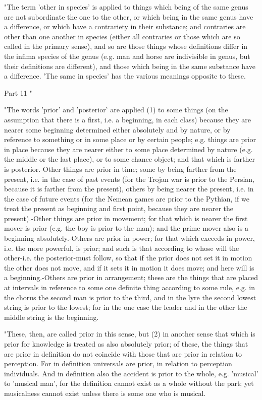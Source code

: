 "The term 'other in species' is applied to things which being of the
same genus are not subordinate the one to the other, or which being
in the same genus have a difference, or which have a contrariety in
their substance; and contraries are other than one another in species
(either all contraries or those which are so called in the primary
sense), and so are those things whose definitions differ in the infima
species of the genus (e.g. man and horse are indivisible in genus,
but their definitions are different), and those which being in the
same substance have a difference. 'The same in species' has the various
meanings opposite to these. 

Part 11 "

"The words 'prior' and 'posterior' are applied (1) to some things
(on the assumption that there is a first, i.e. a beginning, in each
class) because they are nearer some beginning determined either absolutely
and by nature, or by reference to something or in some place or by
certain people; e.g. things are prior in place because they are nearer
either to some place determined by nature (e.g. the middle or the
last place), or to some chance object; and that which is farther is
posterior.-Other things are prior in time; some by being farther from
the present, i.e. in the case of past events (for the Trojan war is
prior to the Persian, because it is farther from the present), others
by being nearer the present, i.e. in the case of future events (for
the Nemean games are prior to the Pythian, if we treat the present
as beginning and first point, because they are nearer the present).-Other
things are prior in movement; for that which is nearer the first mover
is prior (e.g. the boy is prior to the man); and the prime mover also
is a beginning absolutely.-Others are prior in power; for that which
exceeds in power, i.e. the more powerful, is prior; and such is that
according to whose will the other-i.e. the posterior-must follow,
so that if the prior does not set it in motion the other does not
move, and if it sets it in motion it does move; and here will is a
beginning.-Others are prior in arrangement; these are the things that
are placed at intervals in reference to some one definite thing according
to some rule, e.g. in the chorus the second man is prior to the third,
and in the lyre the second lowest string is prior to the lowest; for
in the one case the leader and in the other the middle string is the
beginning. 

"These, then, are called prior in this sense, but (2) in another sense
that which is prior for knowledge is treated as also absolutely prior;
of these, the things that are prior in definition do not coincide
with those that are prior in relation to perception. For in definition
universals are prior, in relation to perception individuals. And in
definition also the accident is prior to the whole, e.g. 'musical'
to 'musical man', for the definition cannot exist as a whole without
the part; yet musicalness cannot exist unless there is some one who
is musical. 

